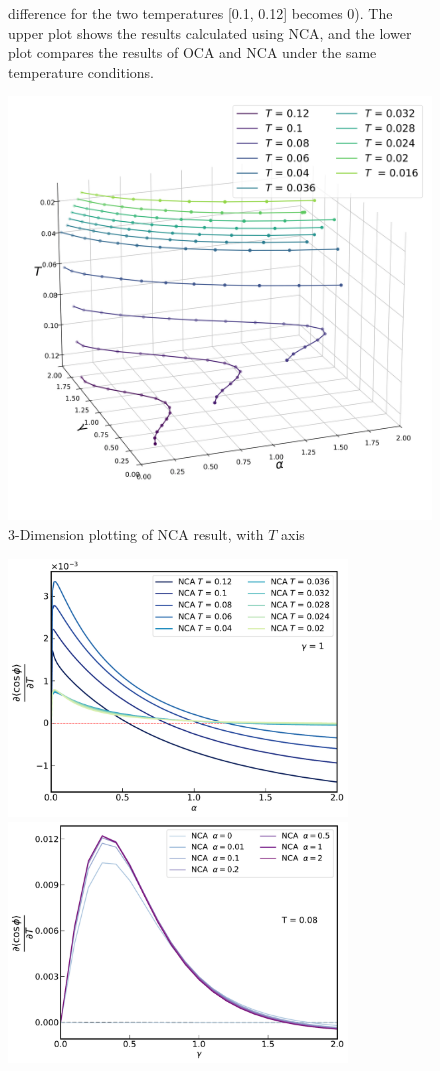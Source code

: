 \documentclass{article}[12pt]
\numberwithin{equation}{section}
\begin{document}
\begin{spacing}{1.5}
\begin{figure}[H]
{  difference for the two temperatures [0.1, 0.12] becomes 0). The upper plot shows the results calculated using NCA, 
  and the lower plot compares the results of OCA and NCA under the same temperature conditions.}
   \label{2Dplot}
\end{figure}
\begin{figure}[H]
  \centerline{\includegraphics[width=13cm]{TexFigure/4/4_3_10_3dplot_Ns3_proj_20-1.png}}
  \caption{3-Dimension plotting of NCA result, with $T$ axis}%
\end{figure}
\pagebreak
\begin{figure}[H]
  \vfill
  \centering
  \centerline{\includegraphics[width=9cm]{TexFigure/4/4_3_11_0.pdf}}
  \centerline{\includegraphics[width=9cm]{TexFigure/4/4_3_11_1.pdf}}

\end{figure}
\end{spacing}
\end{document}
